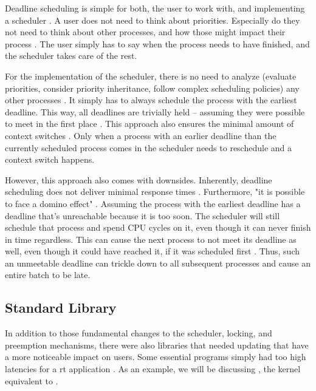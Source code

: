 \documentclass[10pt,twocolumn,a4paper]{article}
\begin{document}
Deadline scheduling is simple for both, the user to work with, and implementing a scheduler \cite{bristot_de_oliveira_deadline_2018}.
A user does not need to think about priorities.
Especially do they not need to think about other processes, and how those might impact their process \cite{bristot_de_oliveira_deadline_2018}.
The user simply has to say when the process needs to have finished, and the scheduler takes care of the rest.

For the implementation of the scheduler, there is no need to analyze (evaluate priorities, consider priority inheritance, follow complex scheduling policies) any other processes \cite{bristot_de_oliveira_deadline_2018}.
It simply has to always schedule the process with the earliest deadline.
This way, all deadlines are trivially held -- assuming they were possible to meet in the first place \cite{bristot_de_oliveira_deadline_2018}.
This approach also ensures the minimal amount of context switches \cite{bristot_de_oliveira_deadline_2018}.
Only when a process with an earlier deadline than the currently scheduled process comes in the scheduler needs to reschedule and a context switch happens.

However, this approach also comes with downsides.
Inherently, deadline scheduling does not deliver minimal response times \cite{bristot_de_oliveira_deadline_2018}.
Furthermore, "it is possible to face a domino effect" \cite{bristot_de_oliveira_deadline_2018}.
Assuming the process with the earliest deadline has a deadline that's unreachable because it is too soon.
The scheduler will still schedule that process and spend CPU cycles on it, even though it can never finish in time regardless.
This can cause the next process to not meet its deadline as well, even though it could have reached it, if it was scheduled first \cite{bristot_de_oliveira_deadline_2018}.
Thus, such an unmeetable deadline can trickle down to all subsequent processes and cause an entire batch to be late.


\subsection{Standard Library}
In addition to those fundamental changes to the scheduler, locking, and preemption mechanisms, there were also libraries that needed updating that have a more noticeable impact on users.
Some essential programs simply had too high latencies for a \acrshort{rt} application \cite{edge_discussion_2022}.
As an example, we will be discussing , the kernel equivalent to .
\end{document}

